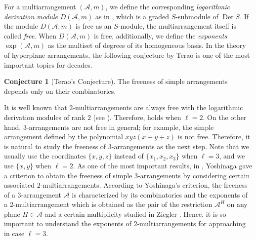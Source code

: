 \documentclass[12pt]{amsart}
\theoremstyle{definition}
\newtheorem{remark}[definition]{Remark}
\newtheorem{conjecture}[definition]{Conjecture}
\newcommand{\KK}{\mathbb{K}}
\newcommand{\AAA}{\mathcal{A}}
\newcommand{\Der}{\operatorname{Der}}
\newcommand{\Ker}{\operatorname{Ker}}
\begin{document}
%
For a multiarrangement $(\AAA,m)$, we define the corresponding 
\emph{logarithmic derivation module} $D(\AAA,m)$ 
as in , 
which is a graded $S$-submodule of $\Der S$. 
%
If the module $D(\AAA,m)$ is free as an $S$-module, 
the multiarrangement itself is called \emph{free}. 
When $D(\AAA,m)$ is free, additionally, 
we define the \emph{exponents} $\exp(\AAA,m)$ 
as the multiset of degrees of its homogeneous basis. 
In the theory of hyperplane arrangements, 
the following conjecture by Terao is one of the most important topics 
for decades. 
\begin{conjecture}[Terao's Conjecture]\label{conjecture:Terao}
    The freeness of simple arrangements %
    depends only on their combinatorics.
\end{conjecture}
It is well known that $2$-multiarrangements 
are always free with the logarithmic derivation modules of rank $2$ 
(see \cite{Ziegler}). 
Therefore,  holds when $\ell=2$. 
On the other hand, $3$-arrangements are not free in general; 
for example, the simple arrangement defined by 
the polynomial
$xyz(x+y+z)$ is not free. 
Therefore, it is natural to study %
the freeness of 
$3$-arrangements as the next step. 
Note that we usually use the coordinates $\{x,y,z\}$ instead of $\{x_1,x_2,x_3\}$ 
when $\ell=3$, and we use 
$\{x,y\}$ %
when $\ell=2$. 
As one of the most important results, in \cite{Yoshinaga-criterion}, 
Yoshinaga gave a criterion to obtain the freeness of simple $3$-arrangements 
by considering certain associated $2$-multiarrangements. %
According to Yoshinaga's criterion, 
the freeness of a $3$-arrangement $\AAA$ 
is characterized by its combinatorics and the exponents 
of a $2$-multiarrangement which is obtained as 
the pair of 
the restriction $\AAA^H$ 
on any plane $H\in\AAA$ and a certain multiplicity studied in Ziegler \cite{Ziegler}. 
Hence, it is so important to understand the exponents of $2$-multiarrangements 
for approaching  in case $\ell=3$. 
\end{document}
